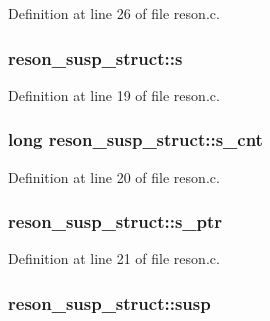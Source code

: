 Definition at line 26 of file reson.\+c.

\subsubsection[{\texorpdfstring{s}{s}}]{ reson\+\_\+susp\+\_\+struct\+::s}\hypertarget{structreson__susp__struct_a98af0b46b949618bb4e2bb614f90d67a}{}\label{structreson__susp__struct_a98af0b46b949618bb4e2bb614f90d67a}


Definition at line 19 of file reson.\+c.

\subsubsection[{\texorpdfstring{s\+\_\+cnt}{s_cnt}}]{\setlength{\rightskip}{0pt plus 5cm}long reson\+\_\+susp\+\_\+struct\+::s\+\_\+cnt}\hypertarget{structreson__susp__struct_a1977a82d2a491bbe52c1bf25e93e9582}{}\label{structreson__susp__struct_a1977a82d2a491bbe52c1bf25e93e9582}


Definition at line 20 of file reson.\+c.

\subsubsection[{\texorpdfstring{s\+\_\+ptr}{s_ptr}}]{ reson\+\_\+susp\+\_\+struct\+::s\+\_\+ptr}\hypertarget{structreson__susp__struct_ada8db7bbea4771ba91874abdc739f21e}{}\label{structreson__susp__struct_ada8db7bbea4771ba91874abdc739f21e}


Definition at line 21 of file reson.\+c.

\subsubsection[{\texorpdfstring{susp}{susp}}]{ reson\+\_\+susp\+\_\+struct\+::susp}\hypertarget{structreson__susp__struct_a46d946451ade0047d9975a5b099762e8}{}\label{structreson__susp__struct_a46d946451ade0047d9975a5b099762e8}


